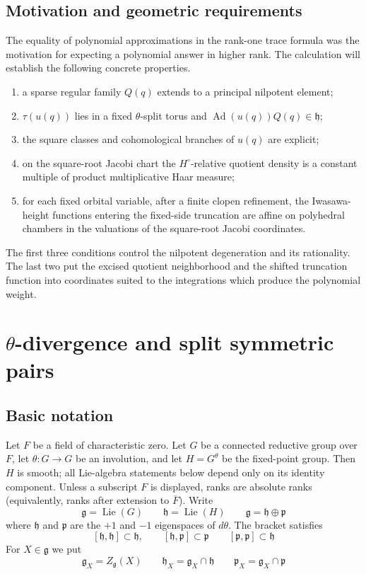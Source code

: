 \documentclass[11pt]{amsart}
\theoremstyle{definition}
\theoremstyle{remark}
\newcommand{\Fb}{\overline F}
\newcommand{\Lie}{\operatorname{Lie}}
\newcommand{\Ad}{\operatorname{Ad}}
\newcommand{\g}{\mathfrak g}
\newcommand{\h}{\mathfrak h}
\newcommand{\p}{\mathfrak p}
\begin{document}
\subsection{Motivation and geometric requirements}
The equality of polynomial approximations in the rank-one trace formula was
the motivation for expecting a polynomial answer in higher rank.  The
calculation will establish the following concrete properties.
\begin{enumerate}[label=\textup{(\alph*)},leftmargin=2.3em]
\item a sparse regular family $Q(q)$ extends to a principal nilpotent element;
\item $\tau(u(q))$ lies in a fixed $\theta$-split torus and
      $\Ad(u(q))Q(q)\in\h$;
\item the square classes and cohomological branches of $u(q)$ are explicit;
\item on the square-root Jacobi chart the $H^\circ$-relative quotient density
      is a constant multiple of product multiplicative Haar measure;
\item for each fixed orbital variable, after a finite clopen refinement, the
      Iwasawa-height functions entering the fixed-side truncation are affine on
      polyhedral chambers in the valuations of the square-root Jacobi
      coordinates.
\end{enumerate}
The first three conditions control the nilpotent degeneration and its
rationality.  The last two put the excised quotient neighborhood and the
shifted truncation function into coordinates suited to the integrations which
produce the polynomial weight.

\section{\texorpdfstring{$\theta$-divergence and split symmetric pairs}{theta-divergence and split symmetric pairs}}

\subsection{Basic notation}
Let $F$ be a field of characteristic zero.  Let $G$ be a
connected reductive group over $F$, let $\theta:G\to G$ be an involution, and
let $H=G^\theta$ be the fixed-point group.  Then $H$ is smooth; all Lie-algebra
statements below depend only on its identity component.  Unless a subscript
$F$ is displayed, ranks are absolute ranks (equivalently, ranks after extension
to $\Fb$).  Write
\[
 \g=\Lie(G)\qquad \h=\Lie(H)\qquad
 \g=\h\oplus\p
\]
where $\h$ and $\p$ are the $+1$ and $-1$ eigenspaces of $d\theta$.
The bracket satisfies
\[
 [\h,\h]\subset\h,\qquad [\h,\p]\subset\p
 \qquad [\p,\p]\subset\h
\]
For $X\in\g$ we put
\[
 \g_X=Z_\g(X)\qquad \h_X=\g_X\cap\h
 \qquad \p_X=\g_X\cap\p
\]
\end{document}
